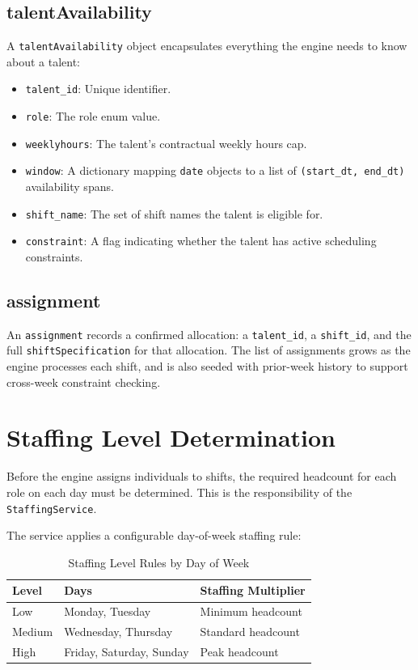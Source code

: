 \subsection{talentAvailability}

A \texttt{talentAvailability} object encapsulates everything the engine needs to know about a talent:
\begin{itemize}
    \item \texttt{talent\_id}: Unique identifier.
    \item \texttt{role}: The role enum value.
    \item \texttt{weeklyhours}: The talent's contractual weekly hours cap.
    \item \texttt{window}: A dictionary mapping \texttt{date} objects to a list of \texttt{(start\_dt, end\_dt)} availability spans.
    \item \texttt{shift\_name}: The set of shift names the talent is eligible for.
    \item \texttt{constraint}: A flag indicating whether the talent has active scheduling constraints.
\end{itemize}

\subsection{assignment}

An \texttt{assignment} records a confirmed allocation: a \texttt{talent\_id}, a \texttt{shift\_id}, and the full \texttt{shiftSpecification} for that allocation. The list of assignments grows as the engine processes each shift, and is also seeded with prior-week history to support cross-week constraint checking.

\section{Staffing Level Determination}

Before the engine assigns individuals to shifts, the required headcount for each role on each day must be determined. This is the responsibility of the \texttt{StaffingService}.

The service applies a configurable day-of-week staffing rule:

\begin{table}[H]
\centering
\caption{Staffing Level Rules by Day of Week}
\label{tab:staffing}
\begin{tabular}{lll}
\toprule
\textbf{Level} & \textbf{Days} & \textbf{Staffing Multiplier} \\
\midrule
Low    & Monday, Tuesday       & Minimum headcount \\
Medium & Wednesday, Thursday   & Standard headcount \\
High   & Friday, Saturday, Sunday & Peak headcount \\
\bottomrule
\end{tabular}
\end{table}

